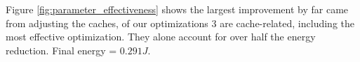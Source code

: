 \documentclass{article}
\begin{document}
\begin{multicols}{2}
  Figure \ref{fig:parameter_effectiveness} shows the largest improvement by far came from adjusting the caches, of our optimizations 3 are cache-related, including the most effective optimization. They alone account for over half the energy reduction. Final energy = $0.291J$.















\end{multicols}
\end{document}
